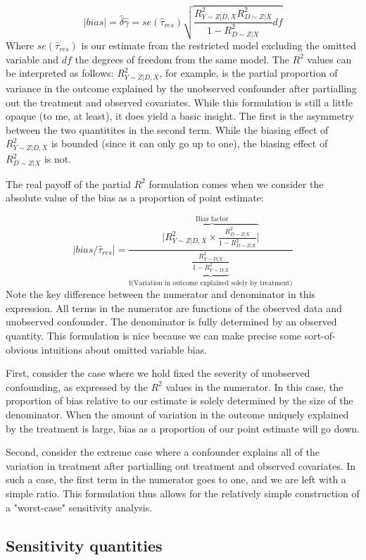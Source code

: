 \documentclass[hidelinks,11pt]{article}
\begin{document}
$$|bias| = \hat \delta \hat \gamma = se(\hat \tau_{res})\sqrt{\frac{R^2_{Y\sim Z|D,X}R^2_{D\sim Z|X}}{1-R^2_{D\sim Z|X}}df}$$
Where $se(\hat \tau_{res})$ is our estimate from the restricted model excluding the omitted variable and $df$ the degrees of freedom from the same model. The $R^2$ values can be interpreted as follows: $R^2_{Y\sim Z|D,X}$, for example, is the partial proportion of variance in the outcome explained by the unobserved confounder after partialling out the treatment and observed covariates. While this formulation is still a little opaque (to me, at least), it does yield a basic insight. The first is the asymmetry between the two quantitites in the second term. While the biasing effect of $R^2_{Y\sim Z|D,X}$ is bounded (since it can only go up to one), the biasing effect of $R^2_{D\sim Z|X}$ is not.

The real payoff of the partial $R^2$ formulation comes when we consider the absolute value of the bias as a proportion of point estimate:

$$|bias/\hat \tau_{res}|= \frac{|\overbrace{R^2_{Y \sim Z|D,X} \times \frac{R^2_{D \sim Z|X}}{1-R^2_{D \sim Z|X}}|}^{\text{Bias factor}} }{\underbrace{\frac{R^2_{Y \sim D|X}}{1 - R^2_{Y \sim D|X}}}_{\text{f(Variation in outcome explained solely by treatment)}}}$$
Note the key difference between the numerator and denominator in this expression. All terms in the numerator are functions of the observed data and unobserved confounder. The denominator is fully determined by an observed quantity. This formulation is nice because we can make precise some sort-of-obvious intuitions about omitted variable bias.

First, consider the case where we hold fixed the severity of unobserved confounding, as expressed by the $R^2$ values in the numerator. In this case, the proportion of bias relative to our estimate is solely determined by the size of the denominator. When the amount of variation in the outcome uniquely explained by the treatment is large, bias as a proportion of our point estimate will go down.

Second, consider the extreme case where a confounder explains all of the variation in treatment after partialling out treatment and observed covariates. In such a case, the first term in the numerator goes to one, and we are left with a simple ratio. This formulation thus allows for the relatively simple construction of a "worst-case" sensitivity analysis.

\subsection{Sensitivity quantities}
\end{document}
